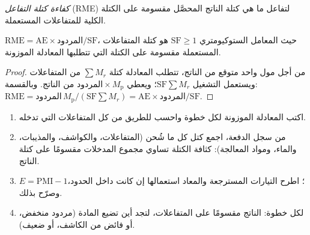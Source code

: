 \begin{definition}\label{def:b3:green-industrial:rme}
\emph{كفاءة كتلة التفاعل} (RME) لتفاعل ما
هي كتلة الناتج المحصَّل مقسومة على الكتلة الكلية
للمتفاعلات المستعملة.
\end{definition}

\begin{proposition}\label{prop:b3:green-industrial:rme}
$\mathrm{RME} = \mathrm{AE} \times \text{المردود}/\mathrm{SF}$، حيث المعامل الستوكيومتري $\mathrm{SF} \ge 1$ هو كتلة
المتفاعلات المستعملة مقسومة على الكتلة التي تتطلبها المعادلة الموزونة.
\end{proposition}

\begin{proof}
من أجل مول واحد متوقع من الناتج، تتطلب المعادلة كتلة $\sum M_r$ من المتفاعلات
ويستعمل التشغيل $\mathrm{SF}\sum M_r$؛ ويعطي $\text{المردود} \times M_{\mathrm p}$ من الناتج. وبالقسمة:
$\mathrm{RME} = \text{المردود}\,M_{\mathrm p}/(\mathrm{SF}\sum M_r) = \mathrm{AE} \times \text{المردود}/\mathrm{SF}$.
\end{proof}

\begin{method}\label{met:b3:green-industrial:metrics}
\begin{enumerate}
  \item اكتب المعادلة الموزونة لكل خطوة واحسب 
        للطريق من كل المتفاعلات التي تدخله.
  \item من سجل الدفعة، اجمع كتل كل ما شُحن (المتفاعلات،
        والكواشف، والمذيبات، والماء، ومواد المعالجة): كثافة الكتلة تساوي مجموع المدخلات مقسومًا على كتلة الناتج.
  \item $E = \mathrm{PMI} - 1$؛ اطرح التيارات المسترجعة والمعاد استعمالها إن كانت داخل
        الحدود، وصرّح بذلك.
  \item {} لكل خطوة: الناتج مقسومًا على المتفاعلات، لتجد أين تضيع المادة
        (مردود منخفض، أو فائض من الكاشف، أو  ضعيف).
\end{enumerate}
\end{method}

